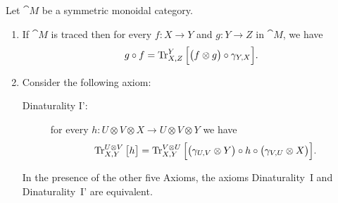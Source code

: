 \documentclass[12pt,oneside,article,draft]{memoir}
\begin{document}
\begin{proposition}\label{prop:dinaturality}\mbox{}
Let $\cat{M}$ be a symmetric monoidal category.
\begin{enumerate}
 \item If $\cat{M}$ is traced then for every $f:X\to Y$ and $g:Y\to Z$ in $\cat{M}$, we have
 \[g\circ f=\operatorname{Tr}^Y_{X,Z}\Big[\big(f\otimes g\big)\circ\gamma_{Y,X}\Big].\]
 \item Consider the following axiom:
 \begin{description}
  \item [Dinaturality I':] for every $h:U\otimes V\otimes X\to U\otimes V\otimes Y$ we have
 \[\operatorname{Tr}^{U\otimes V}_{X,Y}\big[h\big]=\operatorname{Tr}^{V\otimes U}_{X,Y}\Big[\big(\gamma_{U,V}\otimes Y\big)\circ h\circ\big(\gamma_{V,U}\otimes X\big)\Big].\]
 \end{description}
 In the presence of the other five Axioms, the axioms Dinaturality~I and Dinaturality~I' are equivalent.
\end{enumerate}
\end{proposition}
\end{document}
